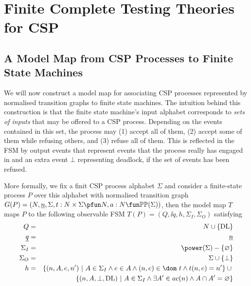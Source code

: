 \section{Finite Complete Testing Theories for CSP}
\label{sec:finitecomplete}
\subsection{A Model Map from CSP Processes to Finite State Machines}
\label{sec:mmap}

We will now construct a model map for associating CSP processes represented by normalised transition graphs to finite state machines. The intuition behind this 
construction is that the finite state machine's input alphabet  corresponds to
{\it sets of inputs} that may be offered to a CSP process. Depending on the events 
contained in this set, the process may (1) accept all of them, (2) accept some of them while refusing others, and (3) refuse all of them. This is reflected in the FSM
by output events that represent events that the process really has engaged in and 
an extra event $\bot$ representing deadlock, if the set of events has been refused.

More formally, we fix a finit CSP process alphabet $\Sigma$ and consider a 
finite-state process 
$P$ over this alphabet with normalised transition graph 
$G(P)=( N, \ii n, \Sigma, t : N\times\Sigma \pfun N, a : N \fun \mathbb{P}\mathbb{P}(\Sigma))$,
 then the model map $T$ maps $P$ to the following observable FSM $T(P) = (Q,\ii q, h,\Sigma_I,\Sigma_O)$ satisfying
\begin{eqnarray*}
Q & = & N\cup \{\DL\} 
\\
\ii q & = & \ii n
\\
\Sigma_I & = & \power(\Sigma) - \{ \varnothing \}
\\
\Sigma_O & = & \Sigma \cup \{ \bot\}
\\
h & = & \{ (n,A,e,n')~|~A\in \Sigma_I \wedge e\in A \wedge 
(n,e)\in \dom~t\wedge t(n,e) = n' \} \cup {}
\\ & & 
\{ (n,A,\bot,\DL)~|~A\in \Sigma_I   \wedge 
\exists A'\in ac(n) \wedge A\cap A' = \varnothing
  \}
\end{eqnarray*} 

